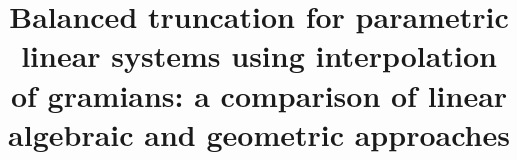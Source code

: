 %
%
%
%
%
%
%
\documentclass[smallcondensed]{svjour3}     %
%
\smartqed  %
%
\usepackage{graphicx}
%
%
\usepackage{amsmath}
\usepackage{amsfonts}
\usepackage{amssymb}
\usepackage{float}
\usepackage{color}
\usepackage{algorithm}
\usepackage{algorithmic}
\renewcommand{\algorithmicrequire}{\textbf{Input:}}
\renewcommand{\algorithmicensure}{\textbf{Output:}}
%
%
%


\title{Balanced truncation for parametric linear systems
	using interpolation of gramians: a comparison of
	linear algebraic and geometric approaches}

